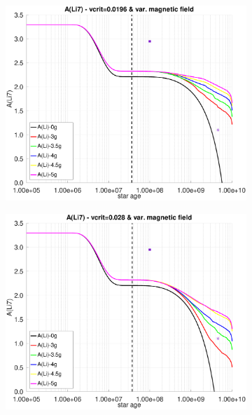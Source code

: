 \documentclass[fleqn,usenatbib]{mnras}
\begin{document}
\begin{figure}
    \begin{subfigure}[h]{0.47\textwidth}
    \includegraphics[trim = 25mm 10mm 15mm 10mm, clip,width=\textwidth]{figures/li_vc_0196_var_g.eps}
    \label{fig:subim23}
    \end{subfigure}
    \begin{subfigure}[h]{0.47\textwidth}
    \includegraphics[trim = 25mm 10mm 15mm 10mm, clip,width=\textwidth]{figures/li_vc_028_var_g.eps}
    \label{fig:subim24}
    \end{subfigure}
    \begin{subfigure}[h]{0.47\textwidth}

\end{subfigure}
\end{figure}
\end{document}
